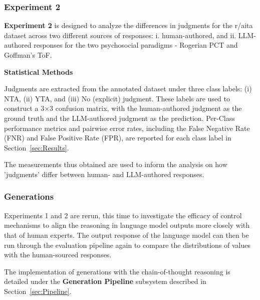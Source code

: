 
\subsubsection{Experiment 2}
\textbf{Experiment 2} is designed to analyze the differences in judgments for the r/aita dataset across two different sources of responses: i. human-authored, and ii. LLM-authored responses for the two psychosocial paradigms - Rogerian PCT and Goffman's ToF.


\smallskip \textbf{Statistical Methods}

Judgments are extracted from the annotated dataset under three class labels: (i) NTA, (ii) YTA, and (iii) No (explicit) judgment. These labels are used to construct a 3×3 confusion matrix, with the human-authored judgment as the ground truth and the LLM-authored judgment as the prediction. Per-Class performance metrics and pairwise error rates, including the False Negative Rate (FNR) and False Positive Rate (FPR), are reported for each class label in Section~\ref{sec:Results}.

The measurements thus obtained are used to inform the analysis on how 'judgments' differ between human- and LLM-authored responses.

\subsubsection{Generations}
Experiments 1 and 2 are rerun, this time to investigate the efficacy of control mechanisms to align the reasoning in language model outputs more closely with that of human experts. The output response of the language model can then be run through the evaluation pipeline again to compare the distributions of values with the human-sourced responses.

The implementation of generations with the chain-of-thought reasoning is detailed under the \textbf{Generation Pipeline} subsystem described in Section~\ref{sec:Pipeline}.

